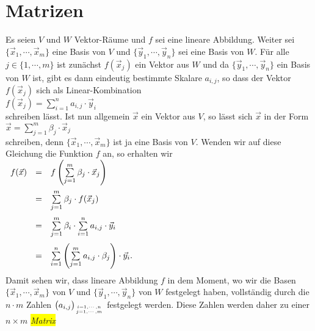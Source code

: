 \section{Matrizen}
Es seien $V$ und $W$ Vektor-R\"{a}ume und $f$ sei eine lineare Abbildung.  Weiter sei
$\{ \vec{x}_1, \cdots, \vec{x}_m \}$ eine Basis von $V$ und 
$\{ \vec{y}_1, \cdots, \vec{y}_n \}$ sei eine Basis von $W$.  F\"{u}r alle $j \in \{1,\cdots,m\}$ ist zun\"{a}chst
$f(\vec{x}_j)$ ein Vektor aus $W$ und da $\{ \vec{y}_1, \cdots, \vec{y}_n \}$ ein Basis von $W$ ist, 
gibt es dann eindeutig bestimmte Skalare $a_{i,j}$, so dass der Vektor $f(\vec{x}_j)$ sich als
Linear-Kombination 
\\[0.2cm]
\hspace*{1.3cm}
$f(\vec{x}_j) = \sum\limits_{i=1}^n a_{i,j} \cdot \vec{y}_i$
\\[0.2cm]
schreiben l\"{a}sst.  Ist nun allgemein $\vec{x}$ ein Vektor aus $V$, so l\"{a}sst sich $\vec{x}$ in der Form 
\\[0.2cm]
\hspace*{1.3cm}
$\vec{x} = \sum\limits_{j=1}^m \beta_j \cdot \vec{x}_j$
\\[0.2cm]
schreiben, denn $\{ \vec{x}_1, \cdots, \vec{x}_m \}$ ist ja eine Basis von $V$.  Wenden wir auf diese Gleichung die Funktion $f$ an, 
so erhalten wir
\\[0.2cm]
\hspace*{1.3cm}
$
\begin{array}[t]{lcl}
  f(\vec{x}) & = & f\left(\sum\limits_{j=1}^m \beta_j \cdot \vec{x}_j\right)                    \\[0.5cm]
                & = & \sum\limits_{j=1}^m \beta_j \cdot f(\vec{x}_j)                               \\[0.5cm]
                & = & \sum\limits_{j=1}^m \beta_i \cdot \sum\limits_{i=1}^n a_{i,j} \cdot \vec{y}_i \\[0.5cm]
                & = &  \sum\limits_{i=1}^n \left(\sum\limits_{j=1}^m a_{i,j} \cdot \beta_j\right) \cdot \vec{y}_i. \\[0.5cm]
\end{array}
$
\\[0.2cm]
Damit sehen wir, dass lineare Abbildung $f$ in dem Moment, wo wir die Basen
$\{ \vec{x}_1, \cdots, \vec{x}_m \}$ von $V$ und $\{ \vec{y}_1, \cdots, \vec{y}_n \}$ von $W$
festgelegt haben, vollst\"{a}ndig durch die $n \cdot m$ Zahlen $\bigl(a_{i,j}\bigr)_{i=1,\cdots,n \atop j=1,\cdots,m}$ festgelegt werden.  Diese Zahlen werden 
daher zu einer $n \times m$ \colorbox{yellow}{\emph{Matrix}}
